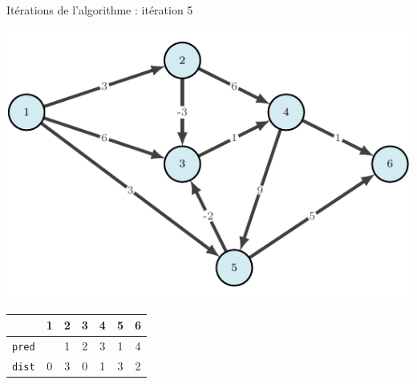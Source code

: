 \begin{frame}{Itérations de l'algorithme : itération 5}
    \begin{center}
        \includegraphics[height=.6\textheight]{fig/bellmann-0.pdf}      
    \begin{tabular}{c|cccccc}
      
        & 1    &2      &3      &4      &5      &6      \\
        \hline
        \texttt{pred} & &1      &2      &3      &1      &4     \\
        \texttt{dist} & 0       &3      &0      &1      &3      &2 \\                    \end{tabular}
\end{center}
\end{frame}


